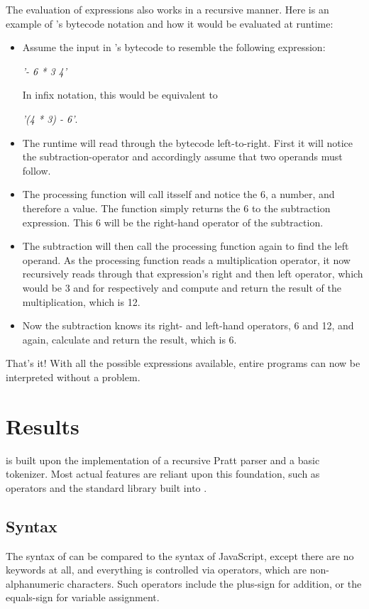 \documentclass[12pt,a4paper]{report}
\newcommand{\expr}[1] {
    \begin{center}
        #1
    \end{center}
}
\begin{document}
The evaluation of expressions also works in a recursive manner. Here is an 
example of \name's bytecode notation and how it would be evaluated at runtime:
\begin{itemize}
    \item Assume the input in \name's bytecode to resemble the following expression: 
        \expr{\emph{'- 6 * 3 4'}}
        In infix notation, this would be equivalent to 
        \expr{\emph{'(4 * 3) - 6'}.}
    \item The runtime will read through the bytecode left-to-right. First it will
        notice the subtraction-operator and accordingly assume that two
        operands must follow.
    \item The processing function will call itsself
        and notice the 6, a number, and therefore a value. The function simply returns the 6
        to the subtraction expression. This 6 will be the right-hand operator
        of the subtraction.
    \item The subtraction will then call the processing function again to find
        the left operand. As the processing function reads a multiplication operator,
        it now recursively reads through that expression's right and then left
        operator, which would be 3 and for respectively and compute and return
        the result of the multiplication, which is 12.
    \item Now the subtraction knows its right- and left-hand operators, 6 and 12,
        and again, calculate and return the result, which is 6.
\end{itemize}

That's it! With all the possible expressions available, entire programs
can now be interpreted without a problem.

\section{Results}

\name is built upon the implementation of a recursive Pratt
parser and a basic tokenizer. Most actual features are reliant upon this
foundation, such as operators and the standard library built into \name.

\subsection{Syntax}
The syntax of \name can be compared to the syntax of JavaScript, except
there are no keywords at all, and everything is controlled via operators,
which are non-alphanumeric characters. Such operators include the plus-sign 
for addition, or the equals-sign for variable assignment.
\end{document}
